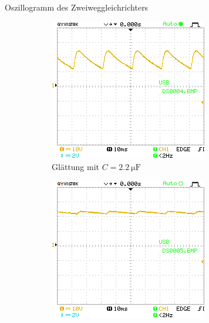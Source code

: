 \documentclass{article}
\theoremstyle{definition}
\begin{document}
\begin{aufgabe}{Oszillogramm des Zweiweggleichrichters}
\begin{figure}[H]
\begin{subfigure}[b]{0.49 \textwidth}
            \includegraphics[width=\textwidth]{MesswerteVersuch2/DS0004.png}
            \caption{Glättung mit $C = \SI{2.2}{\micro\farad}$}
            \label{a3_b}
        \end{subfigure}
        \vspace{1em}
        \begin{subfigure}[b]{0.49 \textwidth}
            \includegraphics[width=\textwidth]{MesswerteVersuch2/DS0005.png}

\end{subfigure}
\end{figure}
\end{aufgabe}
\end{document}
